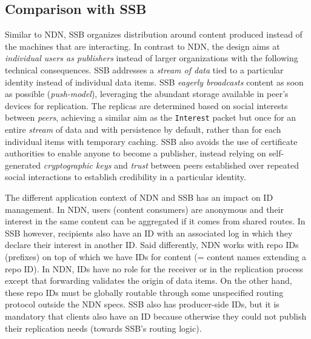 \documentclass[9pt,sigconf]{acmart}
\begin{document}

\subsection{Comparison with SSB}

Similar to NDN, SSB organizes distribution around content produced instead of the machines that are interacting. In contrast to NDN, the design aims at \textit{individual users as publishers} instead of larger organizations with the following technical consequences. SSB addresses a \textit{stream of data} tied to a particular identity instead of individual data items. SSB \textit{eagerly broadcasts} content as soon as possible (\textit{push-model}), leveraging the abundant storage available in peer's devices for replication. The replicas are determined based on social interests between \textit{peers}, achieving a similar aim as the \texttt{Interest} packet but once for an entire \textit{stream} of data and with persistence by default, rather than for each individual items with temporary caching. SSB also avoids the use of certificate authorities to enable anyone to become a publisher, instead relying on self-generated \textit{cryptographic keys} and \textit{trust} between peers established over repeated social interactions to establish credibility in a particular identity.

The different application context of NDN and SSB has an impact on ID management. In NDN, users (content consumers) are anonymous and their interest in the same content can be aggregated if it comes from shared routes. In SSB however, recipients also have an ID with an associated log in which they declare their interest in another ID. Said differently, NDN works with repo IDs
(prefixes) on top of which we have IDs for content (= content names
extending a repo ID). In NDN, IDs have no role for the receiver or in
the replication process except that forwarding validates the origin of
data items. On the other hand, these repo IDs must be globally routable
through some unspecified routing protocol outside the NDN specs. SSB
also has producer-side IDs, but it is mandatory that clients also have
an ID because otherwise they could not publish their replication needs
(towards SSB's routing logic).
\end{document}
